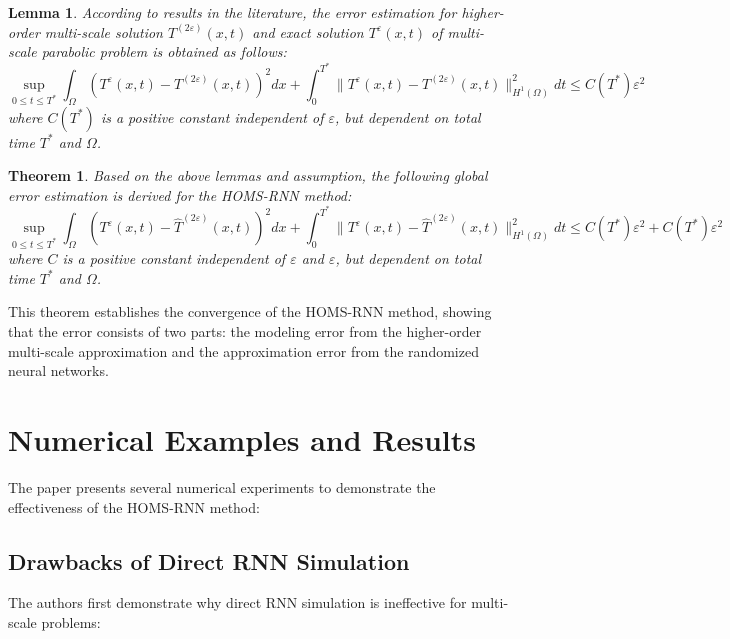 \documentclass[11pt]{article}
\newtheorem{theorem}{Theorem}
\newtheorem{lemma}{Lemma}
\begin{document}
\begin{lemma}
According to results in the literature, the error estimation for higher-order multi-scale solution $T^{(2\varepsilon)}(x,t)$ and exact solution $T^\varepsilon(x,t)$ of multi-scale parabolic problem is obtained as follows:
\begin{equation}
\sup_{0 \leq t \leq T^*} \int_\Omega \left(T^\varepsilon(x,t) - T^{(2\varepsilon)}(x,t)\right)^2 dx + \int_{0}^{T^*} \|T^\varepsilon(x,t) - T^{(2\varepsilon)}(x,t)\|^2_{H^1(\Omega)} dt \leq C(T^*)\varepsilon^2
\end{equation}
where $C(T^*)$ is a positive constant independent of $\varepsilon$, but dependent on total time $T^*$ and $\Omega$.
\end{lemma}

\begin{theorem}
Based on the above lemmas and assumption, the following global error estimation is derived for the HOMS-RNN method:
\begin{equation}
\sup_{0 \leq t \leq T^*} \int_\Omega \left(T^\varepsilon(x,t) - \hat{T}^{(2\varepsilon)}(x,t)\right)^2 dx + \int_{0}^{T^*} \|T^\varepsilon(x,t) - \hat{T}^{(2\varepsilon)}(x,t)\|^2_{H^1(\Omega)} dt \leq C(T^*)\varepsilon^2 + C(T^*)\varepsilon^2
\end{equation}
where $C$ is a positive constant independent of $\varepsilon$ and $\varepsilon$, but dependent on total time $T^*$ and $\Omega$.
\end{theorem}

This theorem establishes the convergence of the HOMS-RNN method, showing that the error consists of two parts: the modeling error from the higher-order multi-scale approximation and the approximation error from the randomized neural networks.

\section{Numerical Examples and Results}

The paper presents several numerical experiments to demonstrate the effectiveness of the HOMS-RNN method:

\subsection{Drawbacks of Direct RNN Simulation}

The authors first demonstrate why direct RNN simulation is ineffective for multi-scale problems:
\end{document}
